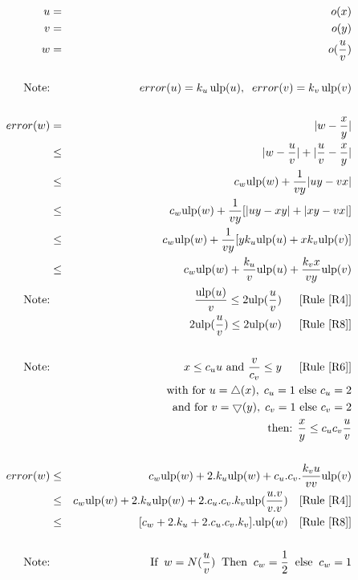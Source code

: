 \documentclass[12pt]{amsart}
\def\n{\textnormal}
\def\pinf{\bigtriangleup}
\def\minf{\bigtriangledown}
\def\ulp{{\rm ulp}}
\newcommand{\U}[1]{\quad \mbox{[Rule~\ref{#1}]}}
\begin{document}
\begin{eqnarray}\nonumber
u&=&o(x) \\\nonumber
v&=&o(y) \\\nonumber
w&=&o(\frac{u}{v}) \\\nonumber
&&\\\nonumber
\textnormal{Note:}&& error(u) = k_u \, \ulp(u), \;\; error(v) = k_v \, \ulp(v)\\\nonumber
&&\\\nonumber
error(w)& = &|w - \frac{x}{y}| \\\nonumber
& \leq &|w - \frac{u}{v}| +|\frac{u}{v} - \frac{x}{y}| \\\nonumber
& \leq & c_w \ulp(w) + \frac{1}{vy}|uy-vx| \\\nonumber
& \leq & c_w \ulp(w) + \frac{1}{vy}[|uy-xy|+|xy-vx| ]\\\nonumber
& \leq & c_w \ulp(w) + \frac{1}{vy}[y k_u \ulp(u)+ x k_v \ulp(v)]\\\nonumber
& \leq & c_w \ulp(w) + \frac{k_u}{v}  \ulp(u)+ \frac{k_v x}{vy} \ulp(v)\\\nonumber
\textnormal{Note:}&& \frac{\ulp(u)}{v} \leq  2 \ulp(\frac{u}{v}) \;\; \U{R4}\\\nonumber
&& 2 \ulp(\frac{u}{v}) \leq  2 \ulp(w) \;\; \U{R8}\\\nonumber
&&\\\nonumber
\textnormal{Note:}&& x \leq c_u u \textnormal{ and } \frac{v}{c_v} \leq y\;\; \U{R6}\\\nonumber
&&\n{with } \n{for } u=\pinf(x),\;c_u=1 \n{ else } c_u=2\\\nonumber
&&\n{ and }\n{for } v=\minf(y),\;c_v=1 \n{ else } c_v=2\\\nonumber
&& \n{then: } \frac{x}{y} \leq c_u c_v  \frac{u}{v} \\\nonumber
&&\\\nonumber
error(w)& \leq & c_w \ulp(w) + 2.k_u  \ulp(w)+ c_u.c_v.\frac{k_v u}{vv} \ulp(v)\\\nonumber
& \leq & c_w \ulp(w) + 2.k_u  \ulp(w)+ 2.c_u.c_v.k_v \ulp(\frac{u.v}{v.v}) \U{R4}\\\nonumber
& \leq & [c_w  + 2.k_u+ 2.c_u.c_v.k_v].\ulp(w) \U{R8}\\\nonumber
&&\\\nonumber
\textnormal{Note:}&&\textnormal{If}\;\; w=N(\frac{u}{v}) \;\;\textnormal{Then}\;\; c_w =\frac{1}{2} \;\;\textnormal{else}\;\; c_w =1\\\nonumber\end{eqnarray}
\end{document}
